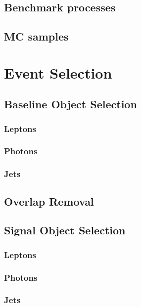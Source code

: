 		\subsection{Benchmark processes}

		\subsection{\ac{MC} samples}


	\section{Event Selection}
	\label{sec:evtsel}

		\subsection*{Baseline Object Selection}

			\subsubsection*{Leptons}
			
			\subsubsection*{Photons}
			
			\subsubsection*{Jets}


		\subsection*{Overlap Removal}

		\subsection*{Signal Object Selection}

			\subsubsection*{Leptons}

			\subsubsection*{Photons}

			\subsubsection*{Jets}


